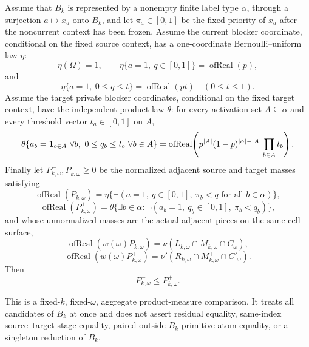 \begin{helper}
Assume that \(B_k\) is represented by a nonempty finite label type
\(\alpha\), through a surjection \(a\mapsto x_a\) onto \(B_k\), and let
\(\pi_a\in[0,1]\) be the fixed priority of \(x_a\) after the noncurrent
context has been frozen.  Assume the current blocker coordinate, conditional
on the fixed source context, has a one-coordinate Bernoulli--uniform law
\(\eta\):
\[
\eta(\Omega)=1,\qquad
\eta\{a=1,\ q\in[0,1]\}=\operatorname{ofReal}(p),
\]
and
\[
\eta\{a=1,\ 0\le q\le t\}=\operatorname{ofReal}(pt)
\quad(0\le t\le1).
\]
Assume the target private blocker coordinates, conditional on the fixed
target context, have the independent product law \(\theta\): for every
activation set \(A\subseteq\alpha\) and every threshold vector
\(t_a\in[0,1]\) on \(A\),
\[
\theta\{a_b={\bf 1}_{b\in A}\ \forall b,\ 
        0\le q_b\le t_b\ \forall b\in A\}
=\operatorname{ofReal}\!\left(
  p^{|A|}(1-p)^{|\alpha|-|A|}\prod_{b\in A}t_b\right).
\]
Finally let \(P^-_{k,\omega},P^+_{k,\omega}\ge0\) be the normalized adjacent
source and target masses satisfying
\[
\operatorname{ofReal}(P^-_{k,\omega})
=\eta\{\neg(a=1,\ q\in[0,1],\ \pi_b<q\text{ for all }b\in\alpha)\},
\]
\[
\operatorname{ofReal}(P^+_{k,\omega})
=\theta\{\exists b\in\alpha:
  \neg(a_b=1,\ q_b\in[0,1],\ \pi_b<q_b)\},
\]
and whose unnormalized masses are the actual adjacent pieces on the same
cell surface,
\[
\operatorname{ofReal}(w(\omega)P^-_{k,\omega})
=\nu(L_{k,\omega}\cap M^-_{k,\omega}\cap C_\omega),
\]
\[
\operatorname{ofReal}(w(\omega)P^+_{k,\omega})
=\nu'(R_{k,\omega}\cap M^+_{k,\omega}\cap C'_\omega).
\]
Then
\[
  P^-_{k,\omega}\le P^+_{k,\omega}.
\]

This is a fixed-\(k\), fixed-\(\omega\), aggregate product-measure
comparison.  It treats all candidates of \(B_k\) at once and does not assert
residual equality, same-index source--target stage equality, paired
outside-\(B_k\) primitive atom equality, or a singleton reduction of \(B_k\).
\end{helper}
